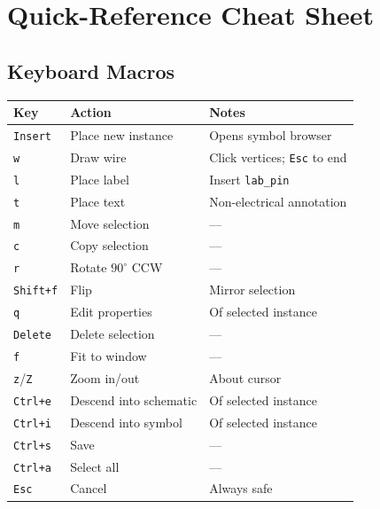 \documentclass[11pt]{article}
\begin{document}
\section{Quick-Reference Cheat Sheet}

\subsection*{Keyboard Macros}

\begin{center}
\begin{tabular}{@{}lll@{}}
\toprule
\textbf{Key} & \textbf{Action} & \textbf{Notes} \\
\midrule
\texttt{Insert}  & Place new instance     & Opens symbol browser \\
\texttt{w}       & Draw wire              & Click vertices; \texttt{Esc} to end \\
\texttt{l}       & Place label            & Insert \texttt{lab\_pin} \\
\texttt{t}       & Place text             & Non-electrical annotation \\
\texttt{m}       & Move selection         & --- \\
\texttt{c}       & Copy selection         & --- \\
\texttt{r}       & Rotate $90^\circ$ CCW  & --- \\
\texttt{Shift+f} & Flip                   & Mirror selection \\
\texttt{q}       & Edit properties        & Of selected instance \\
\texttt{Delete}  & Delete selection       & --- \\
\texttt{f}       & Fit to window          & --- \\
\texttt{z}/\texttt{Z} & Zoom in/out       & About cursor \\
\texttt{Ctrl+e}  & Descend into schematic & Of selected instance \\
\texttt{Ctrl+i}  & Descend into symbol    & Of selected instance \\
\texttt{Ctrl+s}  & Save                   & --- \\
\texttt{Ctrl+a}  & Select all             & --- \\
\texttt{Esc}     & Cancel                 & Always safe \\
\bottomrule
\end{tabular}
\end{center}
\end{document}
